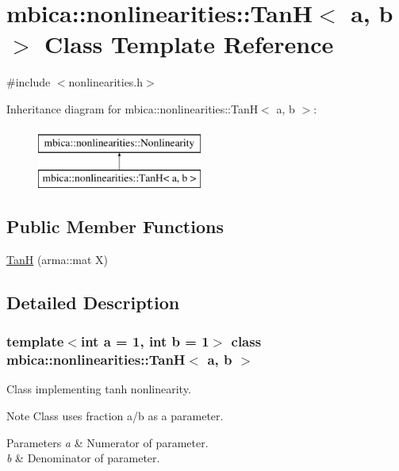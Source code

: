 \hypertarget{classmbica_1_1nonlinearities_1_1_tan_h}{
\section{mbica::nonlinearities::TanH$<$ a, b $>$ Class Template Reference}
\label{classmbica_1_1nonlinearities_1_1_tan_h}
}


{\ttfamily \#include $<$nonlinearities.h$>$}

Inheritance diagram for mbica::nonlinearities::TanH$<$ a, b $>$:\begin{figure}[H]
\begin{center}
\leavevmode
\includegraphics[height=2.000000cm]{classmbica_1_1nonlinearities_1_1_tan_h}
\end{center}
\end{figure}
\subsection*{Public Member Functions}
\begin{DoxyCompactItemize}
\item 
\hyperlink{classmbica_1_1nonlinearities_1_1_tan_h_aa77bdf08978739b666d996c1cb2ab076}{TanH} (arma::mat X)
\end{DoxyCompactItemize}


\subsection{Detailed Description}
\subsubsection*{template$<$int a = 1, int b = 1$>$ class mbica::nonlinearities::TanH$<$ a, b $>$}

Class implementing tanh nonlinearity.

\begin{DoxyNote}{Note}
Class uses fraction a/b as a parameter.
\end{DoxyNote}

\begin{DoxyParams}{Parameters}
{\em a} & Numerator of parameter. \\
\hline
{\em b} & Denominator of parameter. \\
\hline
\end{DoxyParams}


